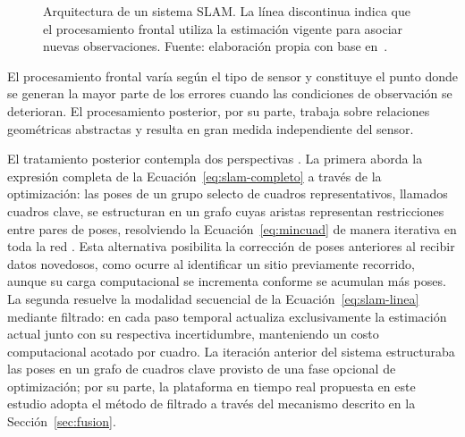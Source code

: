 \begin{figure}[H]
\centering
{}
\caption[Arquitectura de un sistema SLAM]{Arquitectura de un sistema SLAM. La línea discontinua indica que el procesamiento frontal utiliza la estimación vigente para asociar nuevas observaciones. Fuente: elaboración propia con base en~\cite{cadena2016slam}.}
\label{fig:arquitectura-slam}
\end{figure}

El procesamiento frontal varía según el tipo de sensor y constituye el punto donde se generan la mayor parte de los errores cuando las condiciones de observación se deterioran.
El procesamiento posterior, por su parte, trabaja sobre relaciones geométricas abstractas y resulta en gran medida independiente del sensor.

El tratamiento posterior contempla dos perspectivas \cite{cadena2016slam}.
La primera aborda la expresión completa de la Ecuación~\eqref{eq:slam-completo} a través de la optimización: las poses de un grupo selecto de cuadros representativos, llamados cuadros clave, se estructuran en un grafo cuyas aristas representan restricciones entre pares de poses, resolviendo la Ecuación~\eqref{eq:mincuad} de manera iterativa en toda la red \cite{grisetti2010graphslam}.
Esta alternativa posibilita la corrección de poses anteriores al recibir datos novedosos, como ocurre al identificar un sitio previamente recorrido, aunque su carga computacional se incrementa conforme se acumulan más poses.
La segunda resuelve la modalidad secuencial de la Ecuación~\eqref{eq:slam-linea} mediante filtrado: en cada paso temporal actualiza exclusivamente la estimación actual junto con su respectiva incertidumbre, manteniendo un costo computacional acotado por cuadro.
La iteración anterior del sistema estructuraba las poses en un grafo de cuadros clave provisto de una fase opcional de optimización; por su parte, la plataforma en tiempo real propuesta en este estudio adopta el método de filtrado a través del mecanismo descrito en la Sección~\ref{sec:fusion}.

